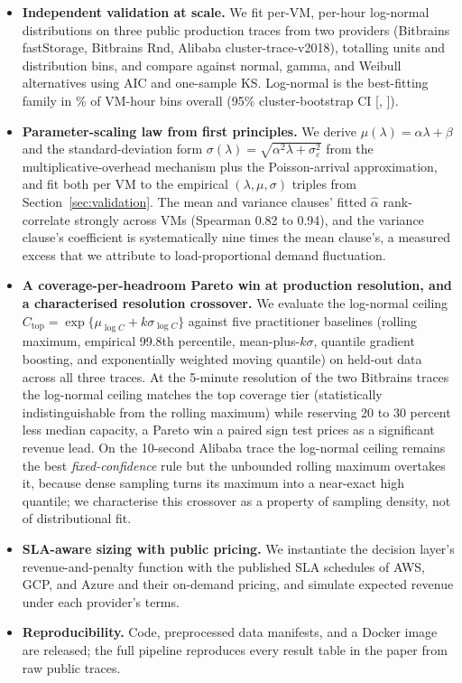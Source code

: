 \documentclass[11pt,a4paper]{article}
\newcommand{\Ctop}{C_{\text{top}}}
\begin{document}
\begin{itemize}
  \item \textbf{Independent validation at scale.} We fit per-VM, per-hour
        log-normal distributions on three public production traces from
        two providers (Bitbrains fastStorage, Bitbrains Rnd, Alibaba
        cluster-trace-v2018), totalling \CombinedNVms{} units and
        \CombinedNBins{} distribution bins, and compare against normal,
        gamma, and Weibull alternatives using AIC and one-sample KS.
        Log-normal is the best-fitting family in \CombinedLogNormShareVmw{}\%
        of VM-hour bins overall (95\% cluster-bootstrap CI
        [\CombinedLogNormShareCiLo, \CombinedLogNormShareCiHi]).
  \item \textbf{Parameter-scaling law from first principles.} We derive
        $\mu(\lambda) = \alpha\lambda + \beta$ and the
        standard-deviation form
        $\sigma(\lambda) = \sqrt{\alpha^2\lambda + \sigma_\varepsilon^2}$
        from the multiplicative-overhead mechanism plus the Poisson-arrival
        approximation, and fit both per VM to the empirical
        $(\lambda,\mu,\sigma)$ triples from Section~\ref{sec:validation}.
        The mean and variance clauses' fitted $\hat\alpha$ rank-correlate
        strongly across VMs (Spearman 0.82 to 0.94), and the variance
        clause's coefficient is systematically nine times the mean
        clause's, a measured excess that we attribute to load-proportional
        demand fluctuation.
  \item \textbf{A coverage-per-headroom Pareto win at production
        resolution, and a characterised resolution crossover.} We
        evaluate the log-normal ceiling
        $\Ctop = \exp\{\mu_{\log C} + k\sigma_{\log C}\}$ against five
        practitioner baselines (rolling maximum, empirical 99.8th
        percentile, mean-plus-$k\sigma$, quantile gradient boosting, and
        exponentially weighted moving quantile) on held-out data across
        all three traces. At the 5-minute resolution of the two Bitbrains
        traces the log-normal ceiling matches the top coverage tier
        (statistically indistinguishable from the rolling maximum) while
        reserving 20 to 30 percent less median capacity, a Pareto win a
        paired sign test prices as a significant revenue lead. On the
        10-second Alibaba trace the log-normal ceiling remains the best
        \emph{fixed-confidence} rule but the unbounded rolling maximum
        overtakes it, because dense sampling turns its maximum into a
        near-exact high quantile; we characterise this crossover as a
        property of sampling density, not of distributional fit.
  \item \textbf{SLA-aware sizing with public pricing.} We instantiate the
        decision layer's revenue-and-penalty function with the published
        SLA schedules of AWS, GCP, and Azure and their on-demand pricing,
        and simulate expected revenue under each provider's terms.
  \item \textbf{Reproducibility.} Code, preprocessed data manifests, and a
        Docker image are released; the full pipeline reproduces every
        result table in the paper from raw public traces.
\end{itemize}
\end{document}
